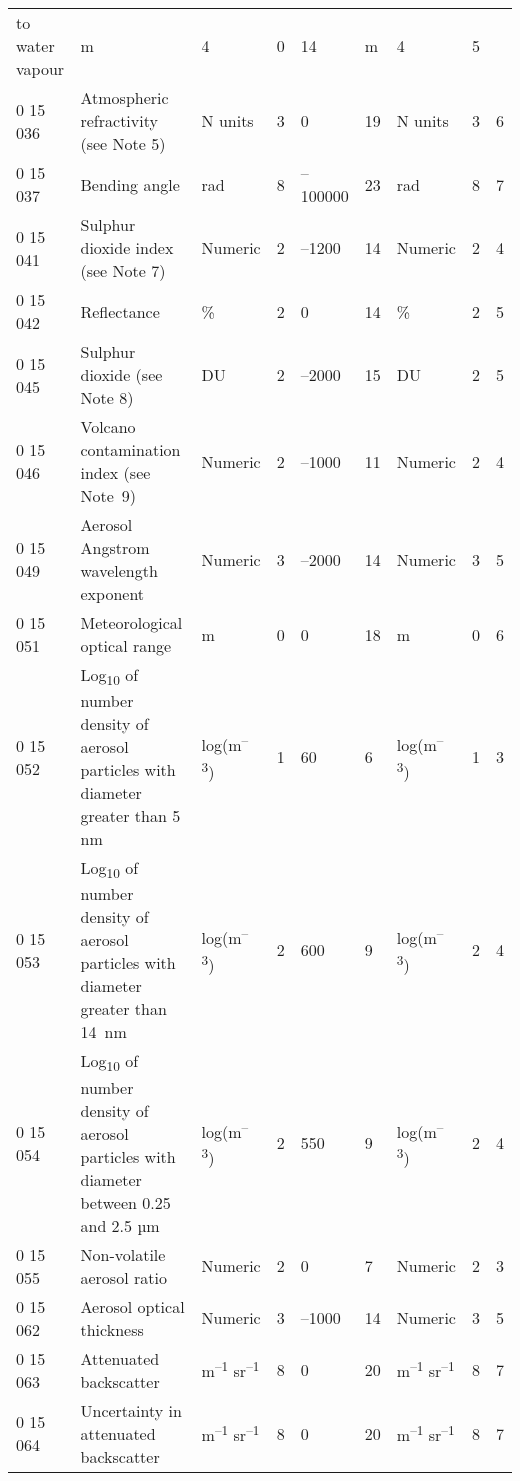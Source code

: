 \begin{longtable}[]{@{}lllllllll@{}}
\begin{minipage}[t]{0.08\columnwidth}
to water vapour\strut
\end{minipage} & \begin{minipage}[t]{0.08\columnwidth}\raggedright
m\strut
\end{minipage} & \begin{minipage}[t]{0.08\columnwidth}\raggedright
4\strut
\end{minipage} & \begin{minipage}[t]{0.08\columnwidth}\raggedright
0\strut
\end{minipage} & \begin{minipage}[t]{0.08\columnwidth}\raggedright
14\strut
\end{minipage} & \begin{minipage}[t]{0.08\columnwidth}\raggedright
m\strut
\end{minipage} & \begin{minipage}[t]{0.08\columnwidth}\raggedright
4\strut
\end{minipage} & \begin{minipage}[t]{0.08\columnwidth}\raggedright
5\strut
\end{minipage}\tabularnewline
0 15 036 & Atmospheric refractivity (see Note 5) & N units & 3 & 0 & 19 & N units & 3 & 6\tabularnewline
0 15 037 & Bending angle & rad & 8 & --100000 & 23 & rad & 8 & 7\tabularnewline
0 15 041 & Sulphur dioxide index (see Note 7) & Numeric & 2 & --1200 & 14 & Numeric & 2 & 4\tabularnewline
0 15 042 & Reflectance & \% & 2 & 0 & 14 & \% & 2 & 5\tabularnewline
0 15 045 & Sulphur dioxide (see Note 8) & DU & 2 & --2000 & 15 & DU & 2 & 5\tabularnewline
0 15 046 & Volcano contamination index (see Note~9) & Numeric & 2 & --1000 & 11 & Numeric & 2 & 4\tabularnewline
0 15 049 & Aerosol Angstrom wavelength exponent & Numeric & 3 & --2000 & 14 & Numeric & 3 & 5\tabularnewline
0 15 051 & Meteorological optical range & m & 0 & 0 & 18 & m & 0 & 6\tabularnewline
0 15 052 & Log\textsubscript{10} of number density of aerosol particles with diameter greater than 5 nm & log(m\textsuperscript{--3}) & 1 & 60 & 6 & log(m\textsuperscript{--3}) & 1 & 3\tabularnewline
0 15 053 & Log\textsubscript{10} of number density of aerosol particles with diameter greater than 14~nm & log(m\textsuperscript{--3}) & 2 & 600 & 9 & log(m\textsuperscript{--3}) & 2 & 4\tabularnewline
0 15 054 & Log\textsubscript{10} of number density of aerosol particles with diameter between 0.25 and 2.5 µm & log(m\textsuperscript{--3}) & 2 & 550 & 9 & log(m\textsuperscript{--3}) & 2 & 4\tabularnewline
0 15 055 & Non-volatile aerosol ratio & Numeric & 2 & 0 & 7 & Numeric & 2 & 3\tabularnewline
0 15 062 & Aerosol optical thickness & Numeric & 3 & --1000 & 14 & Numeric & 3 & 5\tabularnewline
0 15 063 & Attenuated backscatter & m\textsuperscript{--1} sr\textsuperscript{--1} & 8 & 0 & 20 & m\textsuperscript{--1} sr\textsuperscript{--1} & 8 & 7\tabularnewline
0 15 064 & Uncertainty in attenuated backscatter & m\textsuperscript{--1} sr\textsuperscript{--1} & 8 & 0 & 20 & m\textsuperscript{--1} sr\textsuperscript{--1} & 8 & 7\tabularnewline
\bottomrule
\end{longtable}

